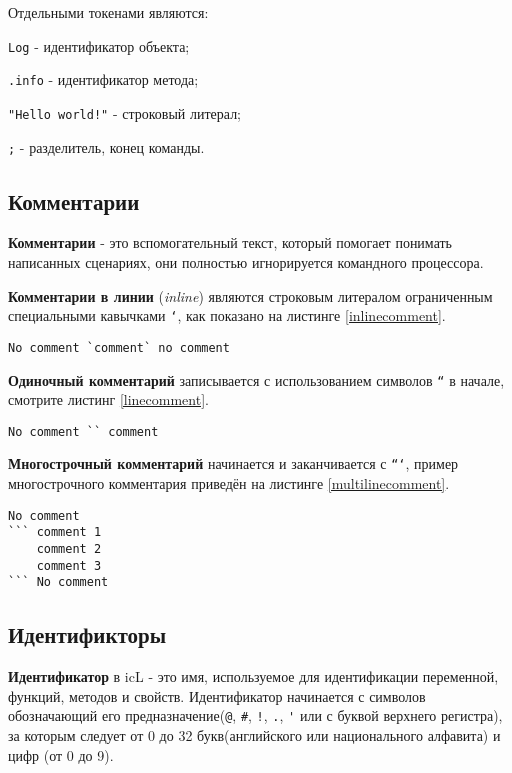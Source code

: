 Отдельными токенами являются:

\begin{icItems}
\item
	\lstinline`Log` - идентификатор объекта;
\item
	\lstinline`.info` - идентификатор метода;
\item
	\lstinline`"Hello world!"` - строковый литерал;
\item
	\lstinline`;` - разделитель, конец команды.
\end{icItems}

\subsection{Комментарии}

\textbf{Комментарии} - это вспомогательный текст, который помогает понимать написанных сценариях, они полностью игнорируется командного процессора.

\textbf{Комментарии в линии} (\textit{inline}) являются строковым литералом ограниченным специальными кавычками \texttt{`}, как показано на листинге \ref{inlinecomment}.

\begin{lstlisting}[caption=Комментарий в линии,label=inlinecomment]
No comment `comment` no comment
\end{lstlisting}

\textbf{Одиночный комментарий} записывается с использованием символов \texttt{``} в начале, смотрите листинг \ref{linecomment}.

\begin{lstlisting}[caption=Одиночный комментарий,label=linecomment]
No comment `` comment
\end{lstlisting}

\textbf{Многострочный комментарий} начинается и заканчивается с \texttt{```}, пример многострочного комментария приведён на листинге \ref{multilinecomment}.

\begin{lstlisting}[caption=Многострочный комментарий,label=multilinecomment]
No comment
``` comment 1
	comment 2
	comment 3
``` No comment
\end{lstlisting}

\subsection{Идентификторы}

\textbf{Идентификатор} в icL - это имя, используемое для идентификации переменной, функций, методов и свойств. Идентификатор начинается с символов обозначающий его предназначение(\lstinline`@`, \lstinline`#`, \lstinline`!`, \lstinline`.`, \lstinline`'` или с буквой верхнего регистра), за которым следует от 0 до 32 букв(английского или национального алфавита) и цифр (от 0 до 9).

